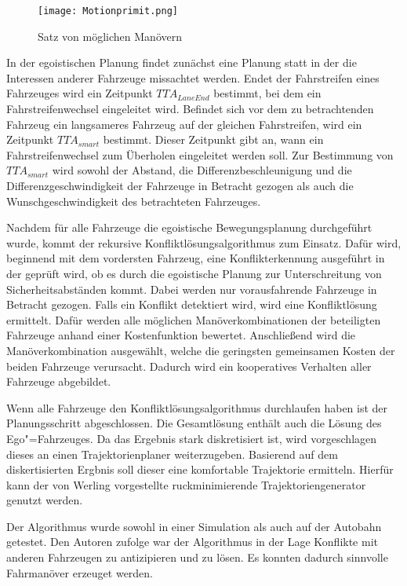 \begin{figure}[!htbp]
    \centering
    \texttt{[image: Motionprimit.png]}
    \caption[Bewegungsprimitive]{Satz von m\"oglichen Man\"overn}
    \label{fig:Motionprimit}
\end{figure}

In der egoistischen Planung findet zun\"achst eine Planung statt in der die Interessen anderer Fahrzeuge missachtet werden. 
Endet der Fahrstreifen eines Fahrzeuges wird ein Zeitpunkt \(TTA_{LaneEnd}\) bestimmt, bei dem ein Fahrstreifenwechsel eingeleitet wird. 
Befindet sich vor dem zu betrachtenden Fahrzeug ein langsameres Fahrzeug auf der gleichen Fahrstreifen, wird ein Zeitpunkt \(TTA_{smart}\) bestimmt. 
Dieser Zeitpunkt gibt an, wann ein Fahrstreifenwechsel zum \"Uberholen eingeleitet werden soll. 
Zur Bestimmung von \(TTA_{smart}\) wird sowohl der Abstand, die Differenzbeschleunigung  und die Differenzgeschwindigkeit der Fahrzeuge in Betracht gezogen als auch die Wunschgeschwindigkeit des betrachteten Fahrzeuges.

Nachdem f\"ur alle Fahrzeuge die egoistische Bewegungsplanung durchgef\"uhrt wurde, kommt der rekursive Konfliktl\"osungsalgorithmus zum Einsatz. 
Daf\"ur wird, beginnend mit dem vordersten Fahrzeug, eine Konflikterkennung ausgef\"uhrt in der gepr\"uft wird, ob es durch die egoistische Planung zur Unterschreitung von Sicherheitsabst\"anden kommt. 
Dabei werden nur vorausfahrende Fahrzeuge in Betracht gezogen. 
Falls ein Konflikt detektiert wird, wird eine Konfliktl\"osung ermittelt. 
Daf\"ur werden alle m\"oglichen Man\"overkombinationen der beteiligten Fahrzeuge anhand einer Kostenfunktion bewertet. 
Anschlie{\ss}end wird die Man\"overkombination ausgew\"ahlt, welche die geringsten gemeinsamen Kosten der beiden Fahrzeuge verursacht. 
Dadurch wird ein kooperatives Verhalten aller Fahrzeuge abgebildet.

Wenn alle Fahrzeuge den Konfliktl\"osungsalgorithmus durchlaufen haben ist der Planungsschritt abgeschlossen. 
Die Gesamtl\"osung enth\"alt auch die L\"osung des Ego"=Fahrzeuges. 
Da das Ergebnis stark diskretisiert ist, wird vorgeschlagen dieses an einen Trajektorienplaner weiterzugeben.
Basierend auf dem diskertisierten Ergbnis soll dieser eine komfortable Trajektorie ermitteln.
Hierf\"ur kann der von Werling \cite{Werling2010} vorgestellte ruckminimierende Trajektoriengenerator genutzt werden.

Der Algorithmus wurde sowohl in einer Simulation als auch auf der Autobahn getestet. 
Den Autoren zufolge war der Algorithmus in der Lage Konflikte mit anderen Fahrzeugen zu antizipieren und zu l\"osen.
Es konnten dadurch sinnvolle Fahrman\"over erzeuget werden.


